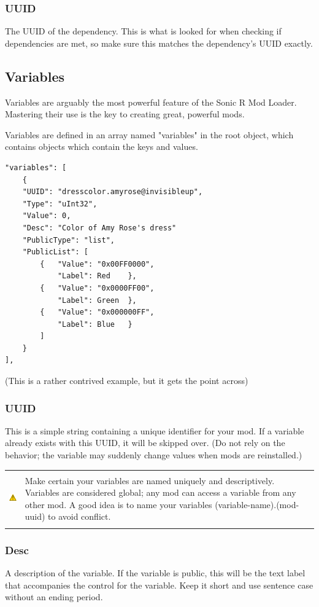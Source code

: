 \documentclass[12pt,a4paper,notitlepage]{article}
\newcommand{\warning}[1]{
	\begin{tabular}{ m{1.1cm}  m{11cm} }
	&\\
	\includegraphics[width=1.1cm, height=1.1cm]{warning} & #1
	\\&\\
	\end{tabular}
}
\begin{document}
\subsubsection{UUID}
The UUID of the dependency. This is what is looked for when checking if dependencies are met, so make sure this matches the dependency's UUID exactly.

\subsection{Variables}
\label{subsec:create-var}
Variables are arguably the most powerful feature of the Sonic R Mod Loader. Mastering their use is the key to creating great, powerful mods.

Variables are defined in an array named "variables" in the root object, which contains objects which contain the keys and values.

\begin{lstlisting}[breaklines=true]
"variables": [
	{	
	"UUID": "dresscolor.amyrose@invisibleup",
	"Type": "uInt32",
	"Value": 0,
	"Desc": "Color of Amy Rose's dress"
	"PublicType": "list",
	"PublicList": [
		{	"Value": "0x00FF0000",
			"Label": Red	},
		{	"Value": "0x0000FF00",
			"Label": Green	},
		{	"Value": "0x000000FF",
			"Label": Blue	}
		]
	}
],
\end{lstlisting}
(This is a rather contrived example, but it gets the point across)

\subsubsection{UUID}
\label{subsubsec:create-var-uuid}
This is a simple string containing a unique identifier for your mod.
If a variable already exists with this UUID, it will be skipped over. (Do not rely on the behavior; the variable may suddenly change values when mods are reinstalled.)

\warning{Make certain your variables are named uniquely and descriptively. Variables are considered global; any mod can access a variable from any other mod. A good idea is to name your variables (variable-name).(mod-uuid) to avoid conflict.}

\subsubsection{Desc}
A description of the variable. If the variable is public, this will be the text label that accompanies the control for the variable. Keep it short and use sentence case without an ending period.
\end{document}
